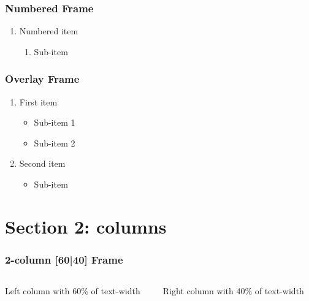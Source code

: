\documentclass[11pt,aspectratio=169]{beamer}  %
\begin{document}
\begin{frame}\frametitle{Numbered Frame}  %
  \begin{enumerate}
    \item Numbered item
    \begin{enumerate}
      \item Sub-item
    \end{enumerate}
  \end{enumerate}
\end{frame}

\begin{frame}\frametitle{Overlay Frame}  %
  \begin{enumerate}[<+->]
    \item First item
    \begin{itemize}
      \item Sub-item 1
      \item Sub-item 2
    \end{itemize}
    \item Second item
    \begin{itemize}
      \item Sub-item
    \end{itemize}
  \end{enumerate}
\end{frame}






\section{Section 2: columns}  %
\begin{frame}\frametitle{2-column [60|40] Frame}  %
  \begin{columns}

    \begin{column}{0.6\textwidth}
    Left column with 60\% of text-width
    \end{column}

    \begin{column}{0.4\textwidth}
      Right column with 40\% of text-width
    \end{column}

    \end{columns}
\end{frame}
\end{document}
